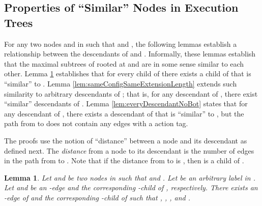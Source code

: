 \documentclass[11pt]{article}
\numberwithin{theorem}{section}
\newtheorem{lemma}[theorem]{Lemma}
\begin{document}
\subsection{Properties of ``Similar'' Nodes in Execution Trees}
\label{subsec:taggedTreeProps}

For any two nodes  and  in  such that  and , the following lemmas establish a
relationship between the descendants of  and . Informally,
these lemmas establish that the maximal subtrees of 
rooted at  and  are in some sense similar to each other.
Lemma \ref{lem:sameConfigSameChild} establishes that for every child
 of  there exists a child  of  that is
``similar'' to . Lemma \ref{lem:sameConfigSameExtensionLength}
extends such similarity to arbitrary descendants of ; that is,
for any descendant  of , there exist ``similar'' descendants
of . Lemma \ref{lem:everyDescendantNoBot} states that for any descendant  of , there exists a descendant  of  that is ``similar'' to , but the path from  to  does not contain any edges with a  action tag.

The proofs use
the notion of ``distance'' between a node and its descendant as
defined next. The \emph{distance} from a node  to its descendant
 is the number of edges in the path from  to
. Note that if the distance from  to  is ,
then  is a child of .





\begin{lemma}\label{lem:sameConfigSameChild}
 Let  and  be two nodes in  such that  and . Let  be an arbitrary label in
 . Let   and  be an -edge and the
 corresponding -child of , respectively. There exists an
 -edge  of  and the corresponding -child
  of  such that , ,
 , and . 
\end{lemma}
\end{document}

